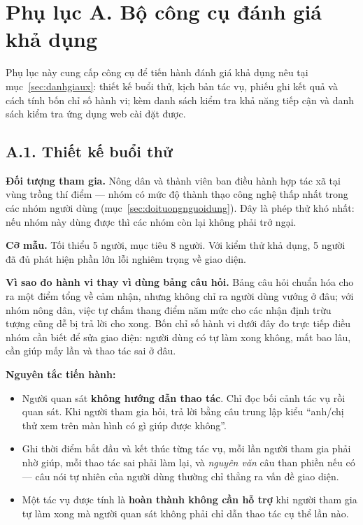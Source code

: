 
\section*{Phụ lục A. Bộ công cụ đánh giá khả dụng}
\label{apdx:khaosat}

Phụ lục này cung cấp công cụ để tiến hành đánh giá khả dụng nêu tại
mục~\ref{sec:danhgiaux}: thiết kế buổi thử, kịch bản tác vụ, phiếu ghi kết quả
và cách tính bốn chỉ số hành vi; kèm danh sách kiểm tra khả năng tiếp cận và
danh sách kiểm tra ứng dụng web cài đặt được.

\subsection*{A.1. Thiết kế buổi thử}

\noindent\textbf{Đối tượng tham gia.} Nông dân và thành viên ban điều hành hợp
tác xã tại vùng trồng thí điểm --- nhóm có mức độ thành thạo công nghệ thấp
nhất trong các nhóm người dùng (mục~\ref{sec:doituongnguoidung}). Đây là phép
thử khó nhất: nếu nhóm này dùng được thì các nhóm còn lại không phải trở ngại.

\noindent\textbf{Cỡ mẫu.} Tối thiểu 5 người, mục tiêu 8 người. Với kiểm thử khả
dụng, 5 người đã đủ phát hiện phần lớn lỗi nghiêm trọng về giao diện.

\noindent\textbf{Vì sao đo hành vi thay vì dùng bảng câu hỏi.} Bảng câu hỏi
chuẩn hóa cho ra một điểm tổng về cảm nhận, nhưng không chỉ ra người dùng vướng
ở đâu; với nhóm nông dân, việc tự chấm thang điểm năm mức cho các nhận định
trừu tượng cũng dễ bị trả lời cho xong. Bốn chỉ số hành vi dưới đây đo trực
tiếp điều nhóm cần biết để sửa giao diện: người dùng có tự làm xong không, mất
bao lâu, cần giúp mấy lần và thao tác sai ở đâu.

\noindent\textbf{Nguyên tắc tiến hành:}
\begin{itemize}
    \item Người quan sát \textbf{không hướng dẫn thao tác}. Chỉ đọc bối cảnh tác
    vụ rồi quan sát. Khi người tham gia hỏi, trả lời bằng câu trung lập kiểu
    ``anh/chị thử xem trên màn hình có gì giúp được không''.
    \item Ghi thời điểm bắt đầu và kết thúc từng tác vụ, mỗi lần người tham gia
    phải nhờ giúp, mỗi thao tác sai phải làm lại, và \emph{nguyên văn} câu than
    phiền nếu có --- câu nói tự nhiên của người dùng thường chỉ thẳng ra vấn đề
    giao diện.
    \item Một tác vụ được tính là \textbf{hoàn thành không cần hỗ trợ} khi người
    tham gia tự làm xong mà người quan sát không phải chỉ dẫn thao tác cụ thể
    lần nào.
\end{itemize}

